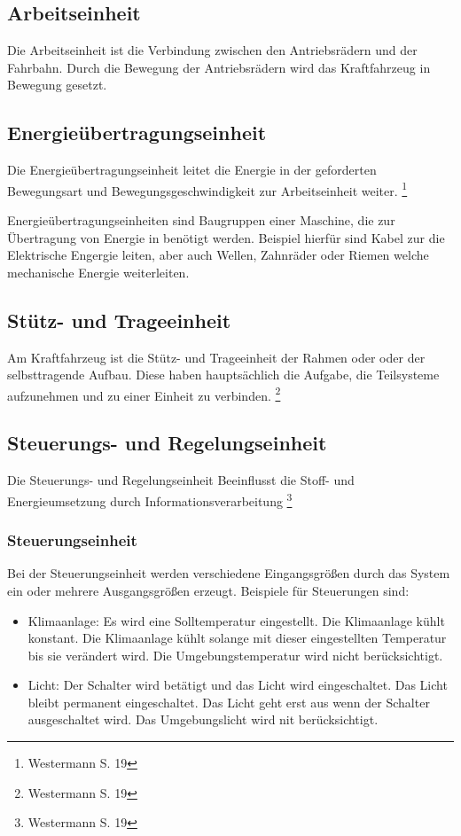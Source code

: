 \subsection{Arbeitseinheit}
Die Arbeitseinheit ist die Verbindung zwischen den Antriebsrädern und der Fahrbahn.
Durch die Bewegung der Antriebsrädern wird das Kraftfahrzeug in Bewegung gesetzt.

\subsection{Energieübertragungseinheit}
Die Energieübertragungseinheit leitet die Energie in der geforderten Bewegungsart und Bewegungsgeschwindigkeit zur Arbeitseinheit weiter.
\footnote{Westermann S. 19}

Energieübertragungseinheiten sind Baugruppen einer Maschine, die zur Übertragung von Energie in benötigt werden. 
Beispiel hierfür sind Kabel zur die Elektrische Engergie leiten, aber auch Wellen, Zahnräder oder Riemen welche mechanische Energie weiterleiten.

\subsection{Stütz- und Trageeinheit}
Am Kraftfahrzeug ist die Stütz- und Trageeinheit der Rahmen oder oder der selbsttragende Aufbau.
Diese haben hauptsächlich die Aufgabe, die Teilsysteme aufzunehmen und zu einer Einheit zu verbinden.
\footnote{Westermann S. 19}


\subsection{Steuerungs- und Regelungseinheit}
Die Steuerungs- und Regelungseinheit Beeinflusst die Stoff- und Energieumsetzung durch Informationsverarbeitung
\footnote{Westermann S. 19}

\subsubsection{Steuerungseinheit}
Bei der Steuerungseinheit werden verschiedene Eingangsgrößen durch das System ein oder mehrere Ausgangsgrößen erzeugt.
Beispiele für Steuerungen sind:
\begin{itemize}
	\item Klimaanlage: Es wird eine Solltemperatur eingestellt.
	      Die Klimaanlage kühlt konstant. 
	      Die Klimaanlage kühlt solange mit dieser eingestellten Temperatur bis sie verändert wird.
	      Die Umgebungstemperatur wird nicht berücksichtigt.
	\item Licht: Der Schalter wird betätigt und das Licht wird eingeschaltet.
	      Das Licht bleibt permanent eingeschaltet.
	      Das Licht geht erst aus wenn der Schalter ausgeschaltet wird.
	      Das Umgebungslicht wird nit berücksichtigt.
\end{itemize}
